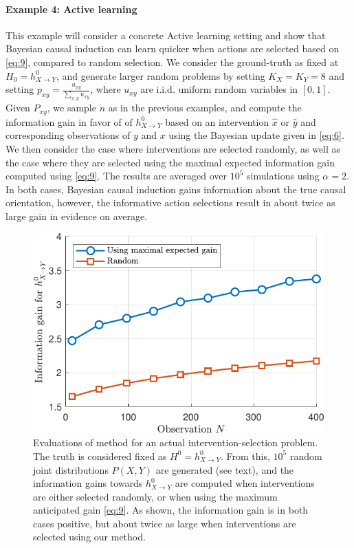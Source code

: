 \documentclass[letterpaper]{article} %
\begin{document}
\paragraph{Example 4: Active learning}
This example will consider a concrete Active learning setting and show that Bayesian causal induction can learn quicker when actions are selected based on \cref{eq:9}, compared to random selection. We consider the ground-truth as fixed at $H_0 = h^0_{X \rightarrow Y}$, and generate larger random problems by setting $K_X = K_Y  =8$ and setting $p_{xy} = \frac{u_{xy}}{\sum_{x,y} u_{xy}}$, where $u_{xy}$ are i.i.d. uniform random variables in $[0,1]$. Given $P_{xy}$, we sample $n$ as in the previous examples, and compute the information gain in favor of of $h^0_{X\rightarrow Y}$ based on an intervention $\hat x$ or $\hat y$ and corresponding observations of $y$ and $x$ using the Bayesian update given in \cref{eq:6}. We then consider the case where interventions are selected randomly,
as well as the case where
they are selected using the maximal expected information gain computed using \cref{eq:9}. The results are averaged over $10^5$ simulations using $\alpha=2$. In both cases, Bayesian causal induction gains information about the true causal orientation, however, the informative action selections result in about twice as large gain in evidence on average.




\begin{figure}[t!]
\centering
\includegraphics[width=.8\linewidth]{fig4xy-crop}
\caption{Evaluations of method for an actual intervention-selection problem. The truth is considered fixed as $H^0 = h^0_{X \rightarrow Y}$. From this, $10^5$ random joint distributions $P(X,Y)$ are generated (see text), and the information gains towards $h^0_{X \rightarrow Y}$ are computed when interventions are either selected randomly, or when using the maximum anticipated gain \cref{eq:9}. As shown, the information gain is in both cases positive, but about twice as large when interventions are selected using our method. }\label{fig5}
\end{figure}
\end{document}
